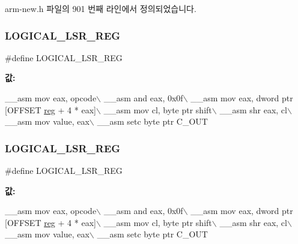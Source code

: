 arm-\/new.\+h 파일의 901 번째 라인에서 정의되었습니다.

\mbox{\label{_g_b_a_8cpp_acbad5309a7193fba0b6584a1b494f4cb}} 
\subsubsection{\texorpdfstring{L\+O\+G\+I\+C\+A\+L\+\_\+\+L\+S\+R\+\_\+\+R\+EG}{LOGICAL\_LSR\_REG}\hspace{0.1cm}{\footnotesize\ttfamily [1/2]}}
{\footnotesize\ttfamily \#define L\+O\+G\+I\+C\+A\+L\+\_\+\+L\+S\+R\+\_\+\+R\+EG}

{\bfseries 값\+:}
\begin{DoxyCode}
\_\_asm mov eax, opcode\(\backslash\)
        \_\_asm and eax, 0x0f\(\backslash\)
        \_\_asm mov eax, dword ptr [OFFSET \mbox{\hyperlink{_g_b_a_8h_ae29faba89509024ffd1a292badcedf2d}{reg}} + 4 * eax]\(\backslash\)
        \_\_asm mov cl, byte ptr shift\(\backslash\)
        \_\_asm shr eax, cl\(\backslash\)
        \_\_asm mov value, eax\(\backslash\)
        \_\_asm setc byte ptr C\_OUT
\end{DoxyCode}
\mbox{\label{arm-new_8h_acbad5309a7193fba0b6584a1b494f4cb}} 
\subsubsection{\texorpdfstring{L\+O\+G\+I\+C\+A\+L\+\_\+\+L\+S\+R\+\_\+\+R\+EG}{LOGICAL\_LSR\_REG}\hspace{0.1cm}{\footnotesize\ttfamily [2/2]}}
{\footnotesize\ttfamily \#define L\+O\+G\+I\+C\+A\+L\+\_\+\+L\+S\+R\+\_\+\+R\+EG}

{\bfseries 값\+:}
\begin{DoxyCode}
\_\_asm mov eax, opcode\(\backslash\)
        \_\_asm and eax, 0x0f\(\backslash\)
        \_\_asm mov eax, dword ptr [OFFSET \mbox{\hyperlink{_g_b_a_8h_ae29faba89509024ffd1a292badcedf2d}{reg}} + 4 * eax]\(\backslash\)
        \_\_asm mov cl, byte ptr shift\(\backslash\)
        \_\_asm shr eax, cl\(\backslash\)
        \_\_asm mov value, eax\(\backslash\)
        \_\_asm setc byte ptr C\_OUT
\end{DoxyCode}


